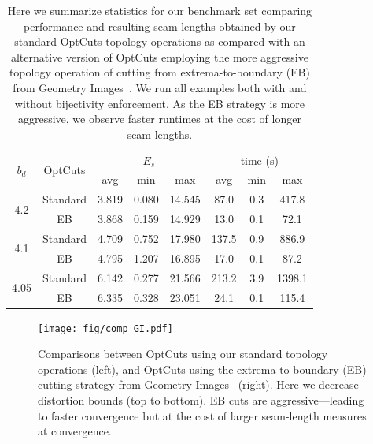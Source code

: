 \begin{table}[t]
\small
\centering
\caption{
Here we summarize statistics for our benchmark set comparing performance and resulting seam-lengths obtained by our standard OptCuts topology operations as compared with an alternative version of OptCuts employing the more aggressive topology operation of cutting from extrema-to-boundary (EB) from Geometry Images~\cite{Gu2002Geometry}. We run all examples both with and without bijectivity enforcement. As the EB strategy is more aggressive, we observe faster runtimes at the cost of longer seam-lengths.} 
\label{tb:comp_GI}
\vspace{-0.3cm}
\begin{tabular}{|c|c|ccc|ccc|}
\hline
\multirow{2}{*}{$b_d$} & \multirow{2}{*}{OptCuts} & \multicolumn{3}{c|}{$E_{s}$} & \multicolumn{3}{c|}{time (s)} \\ \cline{3-8} 
                       &                         & avg      & min     & max      & avg       & min    & max      \\ \hline
\multirow{2}{*}{4.2}   & Standard                    & 3.819   & 0.080  & 14.545  & 87.0   & 0.3 & 417.8 \\
                       & EB                & 3.868   & 0.159  & 14.929  & 13.0   & 0.1 & 72.1  \\ \hline
\multirow{2}{*}{4.1}   & Standard                    & 4.709   & 0.752  & 17.980  & 137.5  & 0.9 & 886.9 \\
                       & EB               & 4.795   & 1.207  & 16.895  & 17.0   & 0.1 & 87.2  \\ \hline
\multirow{2}{*}{4.05}  & Standard                    & 6.142   & 0.277  & 21.566  & 213.2  & 3.9 & 1398.1   \\
                       & EB                & 6.335   & 0.328  & 23.051  & 24.1   & 0.1 & 115.4 \\ \hline
\end{tabular}
\vspace{-0.3cm}
\end{table}

\begin{figure}[t]
\centering
\texttt{[image: fig/comp\_GI.pdf]}
\vspace{-0.3cm}
\caption{Comparisons between OptCuts using our standard topology operations (left), and OptCuts using the extrema-to-boundary (EB) cutting strategy from Geometry Images~\cite{Gu2002Geometry} (right). Here we decrease distortion bounds (top to bottom). EB cuts are aggressive---leading to faster convergence but at the cost of larger seam-length measures at convergence.}
\vspace{-0.3cm}
\label{fig:comp_GI}
\end{figure}

